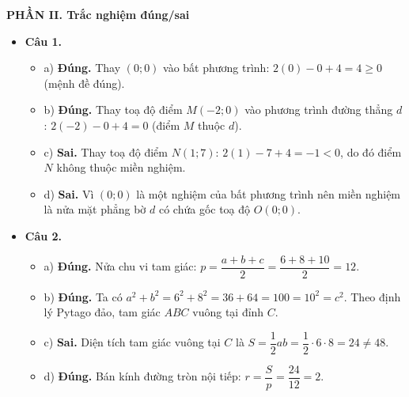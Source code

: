 \documentclass[12pt,a4paper]{article}
\begin{document}
\vspace{0.2cm}
\textbf{\large PHẦN II. Trắc nghiệm đúng/sai}
\begin{itemize}[leftmargin=0.6cm, itemsep=4pt]
    \item \textbf{Câu 1.}
    \begin{itemize}
        \item a) \textbf{Đúng.} Thay $(0; 0)$ vào bất phương trình: $2(0) - 0 + 4 = 4 \ge 0$ (mệnh đề đúng).
        \item b) \textbf{Đúng.} Thay toạ độ điểm $M(-2; 0)$ vào phương trình đường thẳng $d$: $2(-2) - 0 + 4 = 0$ (điểm $M$ thuộc $d$).
        \item c) \textbf{Sai.} Thay toạ độ điểm $N(1; 7)$: $2(1) - 7 + 4 = -1 < 0$, do đó điểm $N$ không thuộc miền nghiệm.
        \item d) \textbf{Sai.} Vì $(0; 0)$ là một nghiệm của bất phương trình nên miền nghiệm là nửa mặt phẳng bờ $d$ có chứa gốc toạ độ $O(0; 0)$.
    \end{itemize}
    \item \textbf{Câu 2.}
    \begin{itemize}
        \item a) \textbf{Đúng.} Nửa chu vi tam giác: $p = \dfrac{a + b + c}{2} = \dfrac{6 + 8 + 10}{2} = 12$.
        \item b) \textbf{Đúng.} Ta có $a^2 + b^2 = 6^2 + 8^2 = 36 + 64 = 100 = 10^2 = c^2$. Theo định lý Pytago đảo, tam giác $ABC$ vuông tại đỉnh $C$.
        \item c) \textbf{Sai.} Diện tích tam giác vuông tại $C$ là $S = \dfrac{1}{2} a b = \dfrac{1}{2} \cdot 6 \cdot 8 = 24 \ne 48$.
        \item d) \textbf{Đúng.} Bán kính đường tròn nội tiếp: $r = \dfrac{S}{p} = \dfrac{24}{12} = 2$.
    \end{itemize}
\end{itemize}
\end{document}
